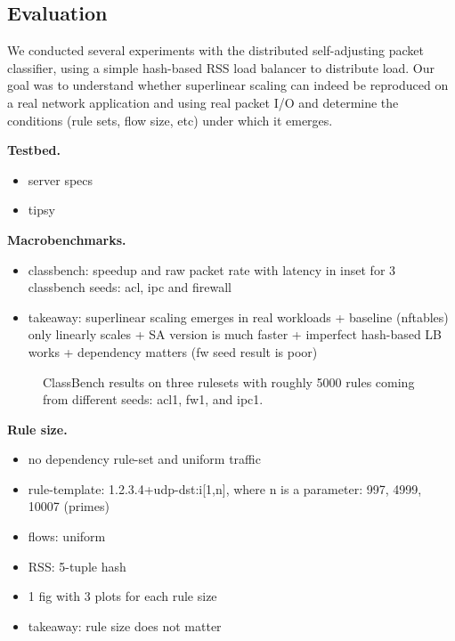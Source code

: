 \subsection{Evaluation}
\label{sec:sa-nf-tables-eval}

We conducted several experiments with the distributed self-adjusting packet classifier, using a simple hash-based RSS load balancer to distribute load. Our goal was to understand whether superlinear scaling can indeed be reproduced on a real network application and using real packet I/O and determine the conditions (rule sets, flow size, etc) under which it emerges.

\noindent
\textbf{Testbed.} %

\begin{itemize}
\item server specs
\item tipsy~\cite{8468219}
\end{itemize}

\noindent
\textbf{Macrobenchmarks.} %
\begin{itemize}
\item classbench: speedup and raw packet rate with latency in inset for 3 classbench seeds: acl, ipc and firewall
\item takeaway: superlinear scaling emerges in real workloads + baseline (nftables) only linearly scales + SA version is much faster + imperfect hash-based LB works + dependency matters (fw seed result is poor)
\end{itemize}

\begin{figure*}
  \centering
  \subfloat[][acl1]{
    \resizebox{.325\textwidth}{!}{
      
      \label{fig:classbench-acl1}
    }
  }
  \subfloat[][fw1]{
    \resizebox{.325\textwidth}{!}{
      
      \label{fig:classbench-fw1}
    }
  }
  \subfloat[][ipc1]{
    \resizebox{.325\textwidth}{!}{
      
      \label{fig:classbench-ipc1}
    }
  }
  \caption{ClassBench results on three rulesets with roughly 5000 rules coming from different seeds: acl1, fw1, and ipc1.}
  \label{fig:classbench}
\end{figure*}

\noindent
\textbf{Rule size.} %
\begin{itemize}
\item no dependency rule-set and uniform traffic
\item rule-template: 1.2.3.4+udp-dst:i[1,n], where n is a parameter: 997, 4999, 10007 (primes)
\item flows: uniform
\item RSS: 5-tuple hash
\item 1 fig with 3 plots for each rule size
\item takeaway: rule size does not matter
\end{itemize}

